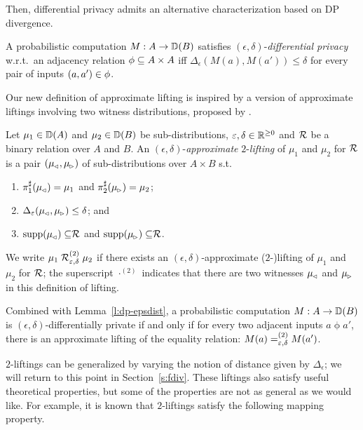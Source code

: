 \documentclass{lmcs}
\begin{document}
Then, differential privacy admits an alternative characterization based on
DP divergence.

\begin{lem} \label{l:dp-epsdist}
  A probabilistic computation $M : A \to {\mathbb{D}}(B)$ satisfies
  $(\epsilon,\delta)$-\emph{differential privacy} w.r.t.\ an
  adjacency relation $\phi \subseteq A \times A$ iff
  $\Delta_{\epsilon} (M(a), M(a')) \leq \delta$ for every pair of
  inputs $(a, a') \in \phi$.
\end{lem}

Our new definition of approximate lifting is inspired by a version of
approximate liftings involving two witness distributions, proposed by
\citet{BartheO13,OlmedoThesis}.

\begin{defi} \label{d:2lift}
  Let $\mu_1 \in {\mathbb{D}}(A)$ and $\mu_2 \in {\mathbb{D}}(B)$ be sub-distributions,
  $\varepsilon, \delta \in \mathbb{R}^{\geq 0}$ and $\mathrel{\mathcal{R}}$ be a binary relation over
  $A$ and $B$. An $(\epsilon, \delta)$-\emph{approximate}
  $2$-\emph{lifting} of $\mu_1$ and $\mu_2$ for $\mathrel{\mathcal{R}}$ is a pair
  $(\mu_{\mspace{-1.5mu}{\scriptscriptstyle \vartriangleleft}}, \mu_{\mspace{-1.5mu}{\scriptscriptstyle \vartriangleright}})$ of sub-distributions over $A \times B$ s.t.
  \begin{enumerate}
    \item $\pi_{1}^{\sharp}(\mu_{\mspace{-1.5mu}{\scriptscriptstyle \vartriangleleft}}) = \mu_1$ and $\pi_{2}^{\sharp}(\mu_{\mspace{-1.5mu}{\scriptscriptstyle \vartriangleright}}) = \mu_2$;
    \item $\Delta_\varepsilon(\mu_{\mspace{-1.5mu}{\scriptscriptstyle \vartriangleleft}}, \mu_{\mspace{-1.5mu}{\scriptscriptstyle \vartriangleright}}) \leq \delta$; and
    \item $\operatorname{supp}(\mu_{\mspace{-1.5mu}{\scriptscriptstyle \vartriangleleft}}) \subseteq \mathrel{\mathcal{R}}$ and $\operatorname{supp}(\mu_{\mspace{-1.5mu}{\scriptscriptstyle \vartriangleright}}) \subseteq \mathrel{\mathcal{R}}$.
  \end{enumerate}
  We write
  $
    \mu_1 \mathrel{\mathrel{\mathcal{R}}^{(2)}_{\varepsilon, \delta}} \mu_2
  $
  if there exists an $(\epsilon, \delta)$-approximate ($2$-)lifting of $\mu_1
$ and $\mu_2$ for $\mathrel{\mathcal{R}}$; the superscript $\cdot^{(2)}$ indicates that
  there are two witnesses $\mu_{\mspace{-1.5mu}{\scriptscriptstyle \vartriangleleft}}$ and $\mu_{\mspace{-1.5mu}{\scriptscriptstyle \vartriangleright}}$ in this definition of
  lifting.
\end{defi}
%
Combined with Lemma~\ref{l:dp-epsdist}, a probabilistic computation $M : A \to
{\mathbb{D}}(B)$ is $(\epsilon, \delta)$-differentially private if and only if for
every two adjacent inputs $a \mathrel{\phi} a'$, there is an approximate
lifting of the equality relation: $M(a) \mathrel{=^{(2)}_{\varepsilon, \delta}} M(a')$.

$2$-liftings can be generalized by varying the notion of distance given by
$\Delta_\epsilon$; we will return to this point in Section~\ref{s:fdiv}. These
liftings also satisfy useful theoretical properties, but some of the properties
are not as general as we would like. For example, it is known that $2$-liftings
satisfy the following mapping property.
\end{document}
